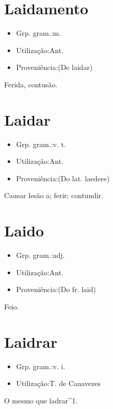 \section{Laidamento}
\begin{itemize}
\item {Grp. gram.:m.}
\end{itemize}
\begin{itemize}
\item {Utilização:Ant.}
\end{itemize}
\begin{itemize}
\item {Proveniência:(De \textunderscore laidar\textunderscore )}
\end{itemize}
Ferida, contusão.
\section{Laidar}
\begin{itemize}
\item {Grp. gram.:v. t.}
\end{itemize}
\begin{itemize}
\item {Utilização:Ant.}
\end{itemize}
\begin{itemize}
\item {Proveniência:(Do lat. \textunderscore laedere\textunderscore )}
\end{itemize}
Causar lesão a; ferir; contundir.
\section{Laido}
\begin{itemize}
\item {Grp. gram.:adj.}
\end{itemize}
\begin{itemize}
\item {Utilização:Ant.}
\end{itemize}
\begin{itemize}
\item {Proveniência:(Do fr. \textunderscore laid\textunderscore )}
\end{itemize}
Feio.
\section{Laidrar}
\begin{itemize}
\item {Grp. gram.:v. i.}
\end{itemize}
\begin{itemize}
\item {Utilização:T. de Canavezes}
\end{itemize}
O mesmo que \textunderscore ladrar\textunderscore ^1.
